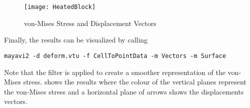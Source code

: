 \begin{figure}
\centerline{\texttt{[image: HeatedBlock]}}
\caption{von-Mises Stress and Displacement Vectors}
\label{HEATEDBLOCK FIG 2}
\end{figure}

\noindent Finally, the results can be visualized by calling
\begin{verbatim}
mayavi2 -d deform.vtu -f CellToPointData -m Vectors -m Surface
\end{verbatim}
Note that the filter  is applied to create a smoother
representation of the von-Mises stress.
 shows the results where the colour of the vertical
planes represent the von-Mises stress and a horizontal plane of arrows shows
the displacements vectors.

